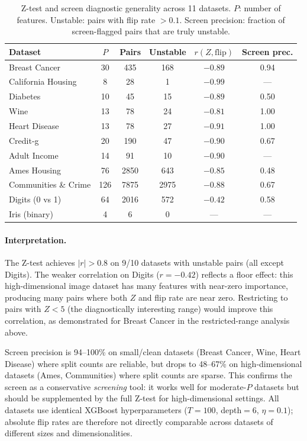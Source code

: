 \documentclass{article}
\begin{document}
\begin{table}[htbp]
\centering
\caption{Z-test and screen diagnostic generality across 11 datasets. $P$: number of
features. Unstable: pairs with flip rate $> 0.1$. Screen precision: fraction of
screen-flagged pairs that are truly unstable.}
\label{tab:f1-generality}
\small
\begin{tabular}{@{}lccccc@{}}
\toprule
Dataset & $P$ & Pairs & Unstable & $r(Z, \text{flip})$ & Screen prec. \\
\midrule
Breast Cancer & 30 & 435 & 168 & $-0.89$ & 0.94 \\
California Housing & 8 & 28 & 1 & $-0.99$ & --- \\
Diabetes & 10 & 45 & 15 & $-0.89$ & 0.50 \\
Wine & 13 & 78 & 24 & $-0.81$ & 1.00 \\
Heart Disease & 13 & 78 & 27 & $-0.91$ & 1.00 \\
Credit-g & 20 & 190 & 47 & $-0.90$ & 0.67 \\
Adult Income & 14 & 91 & 10 & $-0.90$ & --- \\
Ames Housing & 76 & 2850 & 643 & $-0.85$ & 0.48 \\
Communities \& Crime & 126 & 7875 & 2975 & $-0.88$ & 0.67 \\
Digits (0 vs 1) & 64 & 2016 & 572 & $-0.42$ & 0.58 \\
Iris (binary) & 4 & 6 & 0 & --- & --- \\
\bottomrule
\end{tabular}
\end{table}

\paragraph{Interpretation.}
The Z-test achieves $|r| > 0.8$ on 9/10 datasets with unstable
pairs (all except Digits). The weaker correlation on
Digits ($r = -0.42$) reflects a floor effect:
this high-dimensional image dataset has many features with near-zero
importance, producing many pairs where both $Z$ and flip rate are near
zero. Restricting to pairs with
$Z < 5$ (the diagnostically interesting range) would improve this
correlation, as demonstrated for Breast Cancer in the restricted-range
analysis above.

Screen precision is 94--100\% on small/clean datasets (Breast Cancer, Wine,
Heart Disease) where split counts are reliable, but drops to
48--67\% on high-dimensional datasets (Ames, Communities) where split
counts are sparse. This confirms the screen as a conservative
\emph{screening} tool: it works well for moderate-$P$ datasets but
should be supplemented by the full Z-test for high-dimensional settings.
All datasets use identical XGBoost hyperparameters ($T{=}100$,
depth${=}6$, $\eta{=}0.1$); absolute flip rates are therefore not
directly comparable across datasets of different sizes and
dimensionalities.
\end{document}
